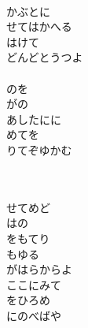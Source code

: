 \documentclass[10pt,b5j]{tarticle} %
\begin{document}
\begin{enumerate}
\begin{minipage}[c]{\blocksize}
        \vspace{\linespace}
        \item~\\
        かぶとに\\
        せてはかへる\\
        はけて\\
        どんどとうつよ\\
        \\
        のを\\
        がの\\
        あしたにに\\
        めてを\\
        りてぞゆかむ
        
    \end{minipage}
    \begin{minipage}[c]{\blocksize}
        
        \vspace{\linespace}
        \item~\\
        \\
        せてめど\\
        はの\\
        をもてり\\
        もゆる\\
        がはらからよ\\
        ここにみて\\
        をひろめ\\
        にのべばや\\
    
    \end{minipage}
\end{enumerate} %
\end{document}
